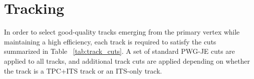 



\section{Tracking}
In order to select good-quality tracks emerging from the primary vertex while maintaining a high efficiency, each track is required to satisfy the cuts summarized in Table ~\ref{tab:track_cuts}. A set of standard PWG-JE cuts are applied to all tracks, and additional track cuts are applied depending on whether the track is a TPC+ITS track or an ITS-only track. 

